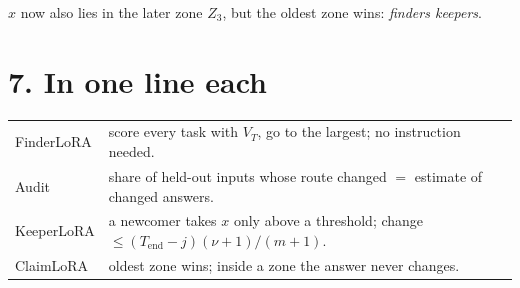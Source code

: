\documentclass[11pt,a4paper]{article}
\begin{document}
\begin{center}
\end{center}

$x$ now also lies in the later zone $Z_3$, but the oldest zone wins: \emph{finders keepers}.

\section*{7. In one line each}

\begin{tabular}{@{}ll@{}}
FinderLoRA & score every task with $V_T$, go to the largest; no instruction needed.\\
Audit & share of held-out inputs whose route changed $=$ estimate of changed answers.\\
KeeperLoRA & a newcomer takes $x$ only above a threshold; change $\le (T_{\text{end}}-j)(\nu+1)/(m+1)$.\\
ClaimLoRA & oldest zone wins; inside a zone the answer never changes.\\
\end{tabular}
\end{document}
